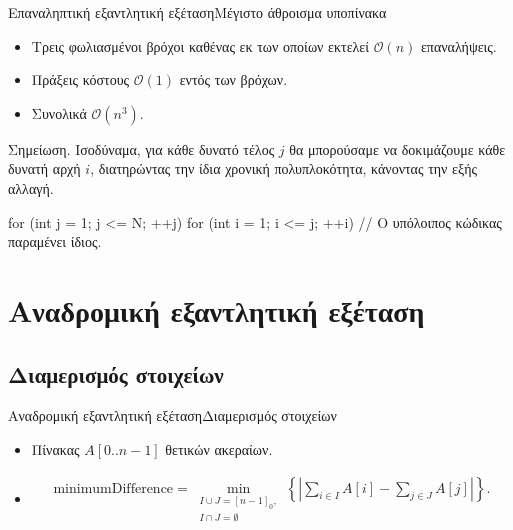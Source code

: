 \documentclass[t,aspectratio=169,9pt]{beamer}
\begin{document}
\begin{frame}[fragile]{Επαναληπτική εξαντλητική εξέταση}{Μέγιστο άθροισμα υποπίνακα}
    \begin{itemize}
        \pause
        \item Τρεις φωλιασμένοι βρόχοι καθένας εκ των οποίων εκτελεί $\mathcal{O}(n)$ επαναλήψεις.
        \pause
        \item Πράξεις κόστους $\mathcal{O}(1)$ εντός των βρόχων.
        \pause
        \item Συνολικά $\mathcal{O}(n^3)$.
    \end{itemize}
    \pause
    \vspace{0.25cm}
    \begin{noteblock}{Σημείωση.}
        Ισοδύναμα, για κάθε δυνατό τέλος $j$ θα μπορούσαμε να δοκιμάζουμε κάθε δυνατή αρχή $i$, διατηρώντας την ίδια χρονική πολυπλοκότητα, κάνοντας την εξής αλλαγή. 
        \begin{cpp}
        for (int j = 1; j <= N; ++j) 
        {
            for (int i = 1; i <= j; ++i) 
            {
                // Ο υπόλοιπος κώδικας παραμένει ίδιος.
            }
        }
        \end{cpp}
    \end{noteblock}
\end{frame}

\section{Αναδρομική εξαντλητική εξέταση}
\subsection{Διαμερισμός στοιχείων}
\begin{frame}{Αναδρομική εξαντλητική εξέταση}{Διαμερισμός στοιχείων}
    \begin{itemize}
        \pause
        \item Πίνακας $A[0..n - 1]$ θετικών ακεραίων.
    \end{itemize}
    \pause
    \begin{itemize}
        \pause
        \item  
        \begin{align*}
            \text{minimumDifference} =
            \min_{\substack{I \cup J = [n - 1]_0, \\ I \cap J = \emptyset}}
            \left\{ \left| \sum_{i \in I} A[i] - \sum_{j \in J} A[j] \right| \right\}.
        \end{align*}
    \end{itemize}
    \pause
\end{frame}
\end{document}
